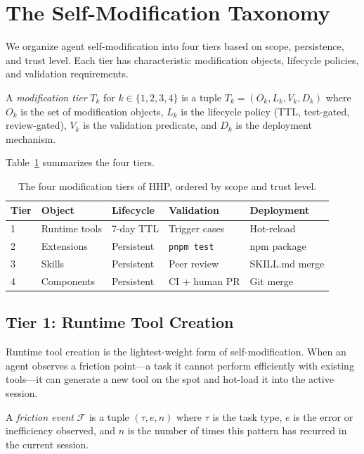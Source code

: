 \section{The Self-Modification Taxonomy}

\label{sec:taxonomy}

We organize agent self-modification into four tiers based on scope, persistence,
and trust level. Each tier has characteristic modification objects, lifecycle
policies, and validation requirements.

\begin{definition}
A \emph{modification tier} $T_k$ for $k \in \{1, 2, 3, 4\}$ is a tuple
$T_k = (O_k, L_k, V_k, D_k)$ where $O_k$ is the set of modification objects,
$L_k$ is the lifecycle policy (TTL, test-gated, review-gated), $V_k$ is the
validation predicate, and $D_k$ is the deployment mechanism.
\end{definition}

Table~\ref{tab:tiers} summarizes the four tiers.

\begin{table}[H]
\centering
\begin{tabularx}{\textwidth}{l X X X X}
\toprule
Tier & Object & Lifecycle & Validation & Deployment \\
\midrule
1 & Runtime tools & 7-day TTL & Trigger cases & Hot-reload \\
2 & Extensions & Persistent & \texttt{pnpm test} & npm package \\
3 & Skills & Persistent & Peer review & SKILL.md merge \\
4 & Components & Persistent & CI + human PR & Git merge \\
\bottomrule
\end{tabularx}
\caption{The four modification tiers of HHP, ordered by scope and trust level.}
\label{tab:tiers}
\end{table}

\subsection{Tier 1: Runtime Tool Creation}
\label{sec:tier1}

Runtime tool creation is the lightest-weight form of self-modification. When an
agent observes a friction point---a task it cannot perform efficiently with
existing tools---it can generate a new tool on the spot and hot-load it into the
active session.

\begin{definition}
A \emph{friction event} $\mathcal{F}$ is a tuple $(\tau, e, n)$ where $\tau$ is
the task type, $e$ is the error or inefficiency observed, and $n$ is the number
of times this pattern has recurred in the current session.
\end{definition}

